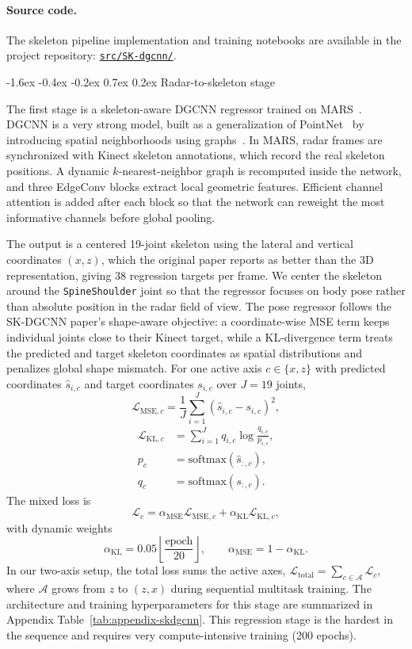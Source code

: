 \documentclass[10pt,twocolumn]{article}
\makeatletter
\renewcommand{\subsection}{%
  \@startsection{subsection}{2}{\z@}%
  {-1.6ex \@plus -0.4ex \@minus -0.2ex}%
  {0.7ex \@plus 0.2ex}%
  {\normalfont\normalsize\bfseries}}
\makeatother
\begin{document}
\paragraph{Source code.}
The skeleton pipeline implementation and training notebooks are available in the project repository:
\href{https://github.com/El-oan/radar_machine_learning/tree/main/src/SK-DGCNN}{\texttt{src/SK-dgcnn/}}.

\subsection{Radar-to-skeleton stage}

The first stage is a skeleton-aware DGCNN regressor trained on MARS~\cite{an2021mars}. DGCNN is a
very strong model, built as a generalization of PointNet~\cite{qi2017pointnet} by introducing
spatial neighborhoods using graphs~\cite{wang2019dgcnn}. In MARS, radar frames are synchronized with Kinect
skeleton annotations, which record the real skeleton positions.
A dynamic $k$-nearest-neighbor graph
is recomputed inside the network, and three EdgeConv blocks extract local
geometric features. Efficient channel attention is added after each block so
that the network can reweight the most informative channels before global
pooling.

The output is a centered 19-joint skeleton using the lateral and vertical
coordinates $(x,z)$, which the original paper reports as better than the
3D representation, giving 38 regression targets per frame. We center the
skeleton around the \texttt{SpineShoulder} joint so that the regressor focuses
on body pose rather than absolute position in the radar field of view.
The pose regressor follows the SK-DGCNN paper's shape-aware objective: a
coordinate-wise MSE term keeps individual joints close to their Kinect target,
while a KL-divergence term treats the predicted and target skeleton coordinates
as spatial distributions and penalizes global shape mismatch. For one active
axis $c \in \{x,z\}$ with predicted coordinates $\hat{s}_{i,c}$ and target
coordinates $s_{i,c}$ over $J=19$ joints,
\[
\mathcal{L}_{\mathrm{MSE},c}
= \frac{1}{J}\sum_{i=1}^{J}(\hat{s}_{i,c}-s_{i,c})^2,
\]
\[
\begin{aligned}
\mathcal{L}_{\mathrm{KL},c}
&= \sum_{i=1}^{J} q_{i,c}\log\frac{q_{i,c}}{p_{i,c}},\\
p_c &= \mathrm{softmax}(\hat{s}_{:,c}),\\
q_c &= \mathrm{softmax}(s_{:,c}).
\end{aligned}
\]
The mixed loss is
\[
\mathcal{L}_{c}
= \alpha_{\mathrm{MSE}}\mathcal{L}_{\mathrm{MSE},c}
+ \alpha_{\mathrm{KL}}\mathcal{L}_{\mathrm{KL},c},
\]
with dynamic weights
\[
\alpha_{\mathrm{KL}} = 0.05\left\lfloor\frac{\mathrm{epoch}}{20}\right\rfloor,
\qquad
\alpha_{\mathrm{MSE}} = 1-\alpha_{\mathrm{KL}}.
\]
In our two-axis setup, the total loss sums the active axes,
$\mathcal{L}_{\mathrm{total}}=\sum_{c\in\mathcal{A}}\mathcal{L}_c$, where
$\mathcal{A}$ grows from $z$ to $(z,x)$ during sequential multitask training.
The architecture and training hyperparameters for this stage are summarized in
Appendix Table~\ref{tab:appendix-skdgcnn}. This regression stage is the hardest in the sequence
and requires very compute-intensive training (200 epochs).
\end{document}
